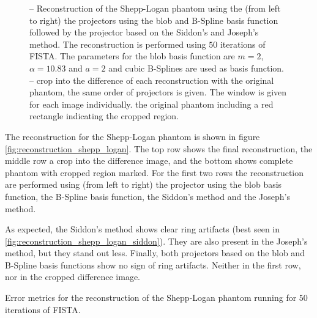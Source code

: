 \begin{figure}

	\caption{--
		Reconstruction of the Shepp-Logan phantom using the (from left to right) the
		projectors using the blob and B-Spline basis function followed by the projector
		based on the Siddon's and Joseph's method. The reconstruction is performed using
		\(50\) iterations of \gls{FISTA}. The parameters for the blob basis function are
		\(m=2\), \(\alpha=10.83\) and \(a=2\) and cubic B-Splines are used as basis
		function.
		--
		crop into the difference of each reconstruction with the original phantom, the same
		order of projectors is given. The window is given for each image individually.
		 the original phantom including a red
		rectangle indicating the cropped region.
	}%
	\label{fig:reconstruction_shepp_logan}
\end{figure}

The reconstruction for the Shepp-Logan phantom is shown in figure
\autoref{fig:reconstruction_shepp_logan}. The top row shows the final reconstruction, the middle row
a crop into the difference image, and the bottom shows complete phantom with cropped region marked.
For the first two rows the reconstruction are performed using (from left to right) the projector
using the blob basis function, the B-Spline basis function, the Siddon's method and the Joseph's
method.

As expected, the Siddon's method shows clear ring artifacts (best seen in
\autoref{fig:reconstruction_shepp_logan_siddon}). They are also present in the Joseph's method, but
they stand out less. Finally, both projectors based on the blob and B-Spline basis functions show no
sign of ring artifacts. Neither in the first row, nor in the cropped difference image.

\begin{table}[h]%
	\centering
	\caption{Error metrics for the reconstruction of the Shepp-Logan phantom running for \(50\)
		iterations of FISTA.}%
	\label{tab:error_metric_shepp_logan}
\end{table}

